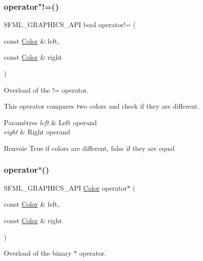 \subsubsection{\texorpdfstring{operator"!=()}{operator!=()}}
{\footnotesize\ttfamily S\+F\+M\+L\+\_\+\+G\+R\+A\+P\+H\+I\+C\+S\+\_\+\+A\+PI bool operator!= (\begin{DoxyParamCaption}\item[{const \hyperlink{classsf_1_1Color}{Color} \&}]{left,  }\item[{const \hyperlink{classsf_1_1Color}{Color} \&}]{right }\end{DoxyParamCaption})\hspace{0.3cm}{\ttfamily [related]}}



Overload of the != operator. 

This operator compares two colors and check if they are different.


\begin{DoxyParams}{Paramètres}
{\em left} & Left operand \\
\hline
{\em right} & Right operand\\
\hline
\end{DoxyParams}
\begin{DoxyReturn}{Renvoie}
True if colors are different, false if they are equal 
\end{DoxyReturn}
\mbox{\label{classsf_1_1Color_aa9de267d831b4ec8ba65b627e51d50c3}} 
\subsubsection{\texorpdfstring{operator$\ast$()}{operator*()}}
{\footnotesize\ttfamily S\+F\+M\+L\+\_\+\+G\+R\+A\+P\+H\+I\+C\+S\+\_\+\+A\+PI \hyperlink{classsf_1_1Color}{Color} operator$\ast$ (\begin{DoxyParamCaption}\item[{const \hyperlink{classsf_1_1Color}{Color} \&}]{left,  }\item[{const \hyperlink{classsf_1_1Color}{Color} \&}]{right }\end{DoxyParamCaption})\hspace{0.3cm}{\ttfamily [related]}}



Overload of the binary $\ast$ operator. 

